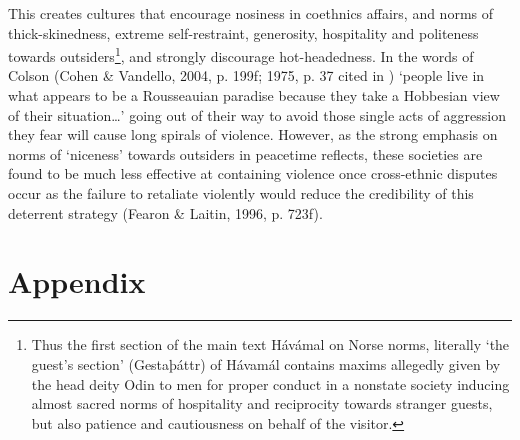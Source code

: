 \documentclass[12pt]{article}
\begin{document}
This creates cultures that encourage nosiness in coethnics affairs, and norms of
thick-skinedness, extreme self-restraint, generosity, hospitality and politeness
towards outsiders\footnote{Thus the first section of the main text Hávámal on
	Norse norms, literally ‘the guest’s section’ (Gestaþáttr) of Hávamál
	contains maxims allegedly given by the head deity Odin to men for proper
	conduct in a nonstate society inducing almost sacred norms of
	hospitality and reciprocity towards stranger guests, but also patience
and cautiousness on behalf of the visitor.}, and strongly discourage
hot-headedness. In the words of Colson (Cohen \& Vandello, 2004, p. 199f; 1975,
p. 37 cited in ) ‘people live in what appears to be a Rousseauian paradise
because they take a Hobbesian view of their situation…’ going out of their way
to avoid those single acts of aggression they fear will cause long spirals of
violence. However, as the strong emphasis on norms of ‘niceness’ towards
outsiders in peacetime reflects, these societies are found to be much less
effective at containing violence once cross-ethnic disputes occur as the failure
to retaliate violently would reduce the credibility of this deterrent strategy
(Fearon \& Laitin, 1996, p. 723f).

\pagebreak




\section{Appendix}
\end{document}
